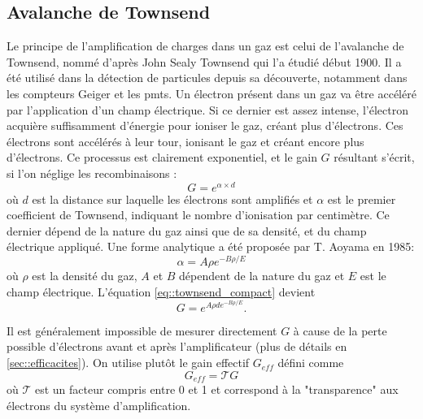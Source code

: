     \subsection{Avalanche de Townsend}\label{sec::townsend}
      
      Le principe de l'amplification de charges dans un gaz est celui de l'avalanche de Townsend, nommé d'après John Sealy Townsend qui l'a étudié début 1900\cite{Townsend1910}. Il a été utilisé dans la détection de particules depuis sa découverte, notamment dans les compteurs Geiger et les \glspl{pmt}. Un électron présent dans un gaz va être accéléré par l'application d'un champ électrique. Si ce dernier est assez intense, l'électron acquière suffisamment d'énergie pour ioniser le gaz, créant plus d'électrons. Ces électrons sont accélérés à leur tour, ionisant le gaz et créant encore plus d'électrons. Ce processus est clairement exponentiel, et le gain $G$ résultant s'écrit, si l'on néglige les recombinaisons :
      \begin{equation}\label{eq::townsend_compact}
        G = e^{\alpha\times d}
      \end{equation}
      où $d$ est la distance sur laquelle les électrons sont amplifiés et $\alpha$ est le premier coefficient de Townsend, indiquant le nombre d'ionisation par centimètre. Ce dernier dépend de la nature du gaz ainsi que de sa densité, et du champ électrique appliqué. Une forme analytique a été proposée par T. Aoyama en 1985\cite{Aoyama1985}:
      \begin{equation}\label{eq::townsend_coef}
        \alpha = A\rho e^{-B\rho/E}
      \end{equation}
      où $\rho$ est la densité du gaz, $A$ et $B$ dépendent de la nature du gaz et $E$ est le champ électrique. L'équation \eqref{eq::townsend_compact} devient
      \begin{equation}\label{eq::townsend}
        G = e^{A\rho  de^{-B\rho /E}}.
      \end{equation}

      Il est généralement impossible de mesurer directement $G$ à cause de la perte possible d'électrons avant et après l'amplificateur (plus de détails en \autoref{sec::efficacites}). On utilise plutôt le gain effectif $G_{eff}$ défini comme
      \begin{equation}\label{eq::gain_eff}
        G _{eff}= \mathcal{T}G
      \end{equation}
      où $\mathcal{T}$ est un facteur compris entre 0 et 1 et correspond à la "transparence" aux électrons du système d'amplification. 

